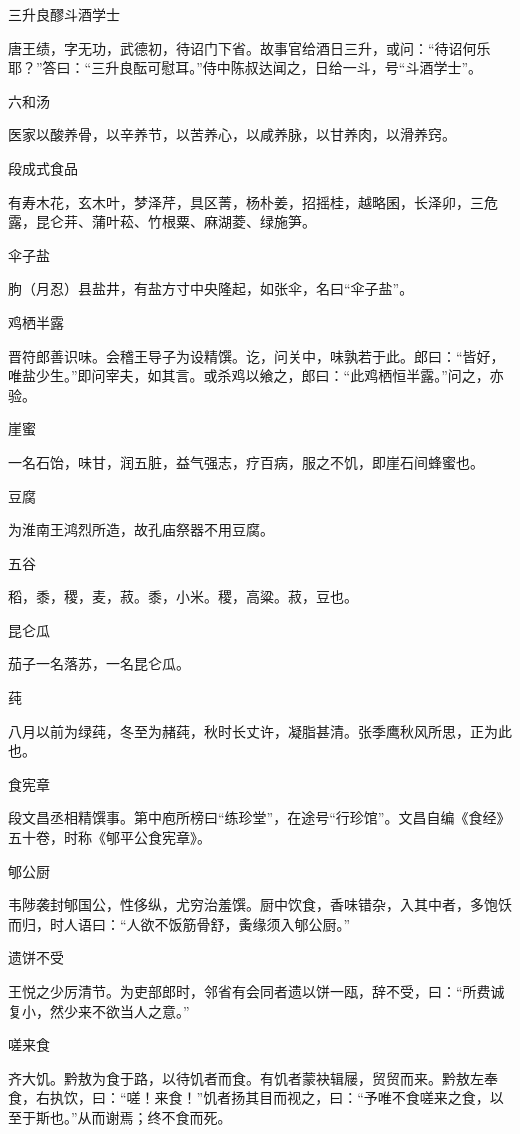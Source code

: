 \documentclass[a4paper,12pt,UTF8,twoside]{ctexbook}
\begin{document}
    三升良醪斗酒学士
    
    唐王绩，字无功，武德初，待诏门下省。故事官给酒日三升，或问：“待诏何乐耶？”答曰：“三升良酝可慰耳。”侍中陈叔达闻之，日给一斗，号“斗酒学士”。
    
    六和汤
    
    医家以酸养骨，以辛养节，以苦养心，以咸养脉，以甘养肉，以滑养窍。
    
    段成式食品
    
    有寿木花，玄木叶，梦泽芹，具区菁，杨朴姜，招摇桂，越略囷，长泽卯，三危露，昆仑茾、蒲叶菘、竹根粟、麻湖菱、绿施笋。
    
    伞子盐
    
    朐（月忍）县盐井，有盐方寸中央隆起，如张伞，名曰“伞子盐”。
    
    鸡栖半露
    
    晋符郎善识味。会稽王导子为设精馔。讫，问关中，味孰若于此。郎曰：“皆好，唯盐少生。”即问宰夫，如其言。或杀鸡以飨之，郎曰：“此鸡栖恒半露。”问之，亦验。
    
    崖蜜
    
    一名石饴，味甘，润五脏，益气强志，疗百病，服之不饥，即崖石间蜂蜜也。
    
    豆腐
    
    为淮南王鸿烈所造，故孔庙祭器不用豆腐。
    
    五谷
    
    稻，黍，稷，麦，菽。黍，小米。稷，高粱。菽，豆也。
    
    昆仑瓜
    
    茄子一名落苏，一名昆仑瓜。
    
    莼
    
    八月以前为绿莼，冬至为赭莼，秋时长丈许，凝脂甚清。张季鹰秋风所思，正为此也。
    
    食宪章
    
    段文昌丞相精馔事。第中庖所榜曰“练珍堂”，在途号“行珍馆”。文昌自编《食经》五十卷，时称《郇平公食宪章》。
    
    郇公厨
    
    韦陟袭封郇国公，性侈纵，尤穷治羞馔。厨中饮食，香味错杂，入其中者，多饱饫而归，时人语曰：“人欲不饭筋骨舒，夤缘须入郇公厨。”
    
    遗饼不受
    
    王悦之少厉清节。为吏部郎时，邻省有会同者遗以饼一瓯，辞不受，曰：“所费诚复小，然少来不欲当人之意。”
    
    嗟来食
    
    齐大饥。黔敖为食于路，以待饥者而食。有饥者蒙袂辑屦，贸贸而来。黔敖左奉食，右执饮，曰：“嗟！来食！”饥者扬其目而视之，曰：“予唯不食嗟来之食，以至于斯也。”从而谢焉；终不食而死。
    
\end{document}

